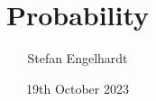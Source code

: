 \documentclass[11pt,pdf,ngerman,UKenglish]{beamer}%
\title{Probability}
\author{Stefan Engelhardt}
\date{19th October 2023}%
\newcommand{\IR}{\mathds{R}}
\newcommand{\IP}{\mathbb{P}}
\newcommand{\IE}{{\mathbb{E}}}
\newcommand{\1}{\mathbb{1}}
\theoremstyle{thm}
\theoremstyle{def}
\begin{document}
\begin{frame}
\titlepage
\end{frame}
\logo{}




%
%
%
%
%
\end{document}
